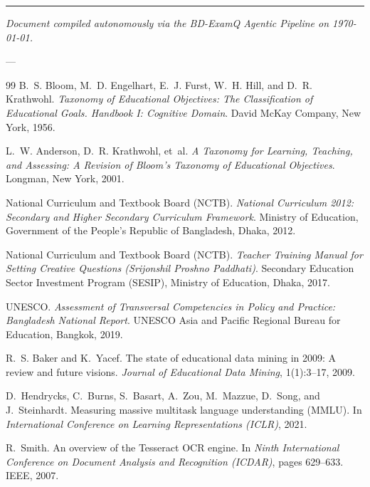 \documentclass[11pt,a4paper]{article}
\begin{document}
\vspace{1.5em}
\noindent\rule{\textwidth}{0.4pt}
\begin{center}
\small \textsl{Document compiled autonomously via the BD-ExamQ Agentic Pipeline on \today.}
\end{center}

---

\begin{thebibliography}{99}
B.~S. Bloom, M.~D. Engelhart, E.~J. Furst, W.~H. Hill, and D.~R. Krathwohl.
\newblock \textsl{Taxonomy of Educational Objectives: The Classification of Educational Goals. Handbook I: Cognitive Domain}.
\newblock David McKay Company, New York, 1956.

L.~W. Anderson, D.~R. Krathwohl, et~al.
\newblock \textsl{A Taxonomy for Learning, Teaching, and Assessing: A Revision of Bloom's Taxonomy of Educational Objectives}.
\newblock Longman, New York, 2001.

National Curriculum and Textbook Board (NCTB).
\newblock \textsl{National Curriculum 2012: Secondary and Higher Secondary Curriculum Framework}.
\newblock Ministry of Education, Government of the People's Republic of Bangladesh, Dhaka, 2012.

National Curriculum and Textbook Board (NCTB).
\newblock \textsl{Teacher Training Manual for Setting Creative Questions (Srijonshil Proshno Paddhati)}.
\newblock Secondary Education Sector Investment Program (SESIP), Ministry of Education, Dhaka, 2017.

UNESCO.
\newblock \textsl{Assessment of Transversal Competencies in Policy and Practice: Bangladesh National Report}.
\newblock UNESCO Asia and Pacific Regional Bureau for Education, Bangkok, 2019.

R.~S. Baker and K.~Yacef.
\newblock The state of educational data mining in 2009: A review and future visions.
\newblock \textsl{Journal of Educational Data Mining}, 1(1):3--17, 2009.

D.~Hendrycks, C.~Burns, S.~Basart, A.~Zou, M.~Mazzue, D.~Song, and J.~Steinhardt.
\newblock Measuring massive multitask language understanding ({MMLU}).
\newblock In \textsl{International Conference on Learning Representations (ICLR)}, 2021.

R.~Smith.
\newblock An overview of the {Tesseract} {OCR} engine.
\newblock In \textsl{Ninth International Conference on Document Analysis and Recognition (ICDAR)}, pages 629--633. IEEE, 2007.


\end{thebibliography}
\end{document}
